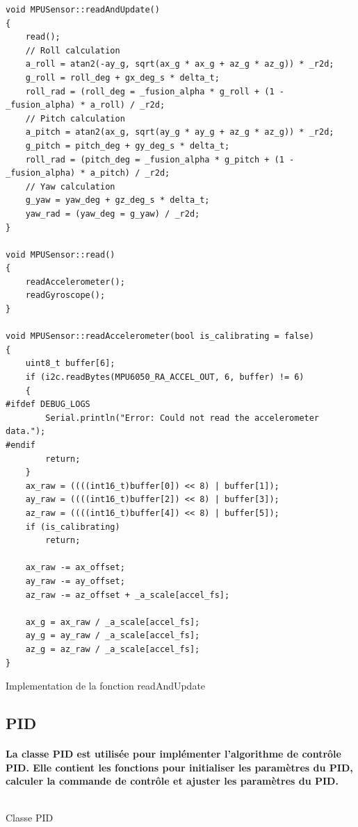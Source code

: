 \begin{listing}[!htpb]
	\begin{verbatim}
void MPUSensor::readAndUpdate()
{
	read();
	// Roll calculation
	a_roll = atan2(-ay_g, sqrt(ax_g * ax_g + az_g * az_g)) * _r2d;
	g_roll = roll_deg + gx_deg_s * delta_t;
	roll_rad = (roll_deg = _fusion_alpha * g_roll + (1 - _fusion_alpha) * a_roll) / _r2d;
	// Pitch calculation
	a_pitch = atan2(ax_g, sqrt(ay_g * ay_g + az_g * az_g)) * _r2d;
	g_pitch = pitch_deg + gy_deg_s * delta_t;
	roll_rad = (pitch_deg = _fusion_alpha * g_pitch + (1 - _fusion_alpha) * a_pitch) / _r2d;
	// Yaw calculation
	g_yaw = yaw_deg + gz_deg_s * delta_t;
	yaw_rad = (yaw_deg = g_yaw) / _r2d;
}

void MPUSensor::read()
{
	readAccelerometer();
	readGyroscope();
}

void MPUSensor::readAccelerometer(bool is_calibrating = false)
{
	uint8_t buffer[6];
	if (i2c.readBytes(MPU6050_RA_ACCEL_OUT, 6, buffer) != 6)
	{
#ifdef DEBUG_LOGS
		Serial.println("Error: Could not read the accelerometer data.");
#endif
		return;
	}
	ax_raw = ((((int16_t)buffer[0]) << 8) | buffer[1]);
	ay_raw = ((((int16_t)buffer[2]) << 8) | buffer[3]);
	az_raw = ((((int16_t)buffer[4]) << 8) | buffer[5]);
	if (is_calibrating)
		return;

	ax_raw -= ax_offset;
	ay_raw -= ay_offset;
	az_raw -= az_offset + _a_scale[accel_fs];

	ax_g = ax_raw / _a_scale[accel_fs];
	ay_g = ay_raw / _a_scale[accel_fs];
	az_g = az_raw / _a_scale[accel_fs];
}
	\end{verbatim}
	\caption{Implementation de la fonction readAndUpdate}
	\label{listing:mpu-read-and-update}
\end{listing}

\subsection{PID}

\paragraph{La classe PID est utilisée pour implémenter l'algorithme de contrôle PID. Elle contient les fonctions pour initialiser les paramètres du PID, calculer la commande de contrôle et ajuster les paramètres du PID.}
\paragraph*{}
\begin{listing}[!htpb]
	\inputminted{cpp}{Code/PIDController.h}
	\caption{Classe PID}
	\label{listing:pid}
\end{listing}

